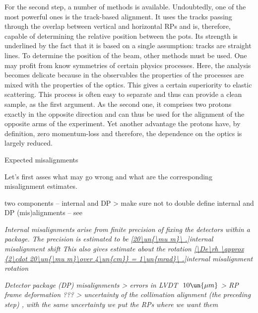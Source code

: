 For the second step, a number of methods is available. Undoubtedly, one of the most powerful ones is the track-based alignment. It uses the tracks passing through the overlap between vertical and horizontal RPs and is, therefore, capable of determining the relative position between the pots. Its strength is underlined by the fact that it is based on a single assumption: tracks are straight lines. To determine the position of the beam, other methods must be used. One may profit from know symmetries of certain physics processes. Here, the analysis becomes delicate because in the observables the properties of the processes are mixed with the properties of the optics. This gives a certain superiority to elastic scattering. This process is often easy to separate and thus can provide a clean sample, as the first argument. As the second one, it comprises two protons exactly in the opposite direction and can thus be used for the alignment of the opposite arms of the experiment. Yet another advantage the protons have, by definition, zero momentum-loss and therefore, the dependence on the optics is largely reduced.
\fi

\caption{Expected misalignments}

Let's first asses what may go wrong and what are the corresponding misalignment estimates.

\> two components -- internal and DP
\>> make sure not to double define internal and DP (mis)alignments -- see 

\> \em{Internal misalignments} arise from finite precision of fixing the detectors within a package. The precision is estimated to be
\eqref{20\un{\mu m}\ .}{internal misalignment shift}
This also gives estimate about the rotation
\eqref{\De\rh \approx {2\cdot 20\un{\mu m}\over 4\un{cm}} = 1\un{mrad}\ .}{internal misalignment rotation}

\> \em{Detector package (DP) misalignments}
\>> errors in LVDT $~10\un{\mu m}$
\>> RP frame deformation ???
\>> uncertainty of the collimation alignment (the preceding step) , with the same uncertainty we put the RPs where we want them



